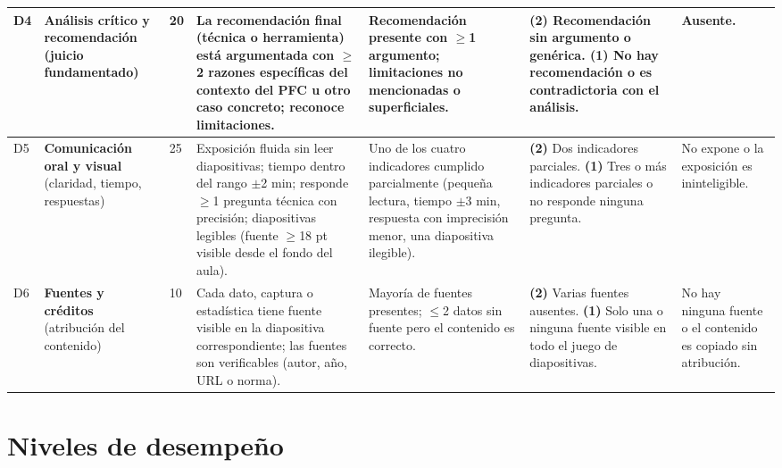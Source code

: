 \documentclass[11pt]{article}
\begin{document}
{\begin{longtable}{|C{0.45cm}|L{2.4cm}|C{0.65cm}|L{3.1cm}|L{3.1cm}|L{3.1cm}|L{2.4cm}|}
	\hline
	 D4 & \textbf{Análisis crítico y recomendación} (juicio fundamentado) & 20 & La recomendación final (técnica o herramienta) está argumentada con $\geq$2 razones específicas del contexto del PFC u otro caso concreto; reconoce limitaciones. & Recomendación presente con $\geq$1 argumento; limitaciones no mencionadas o superficiales. & \textbf{(2)} Recomendación sin argumento o genérica. \textbf{(1)} No hay recomendación o es contradictoria con el análisis. & Ausente.\\
	\hline
	D5 & \textbf{Comunicación oral y visual} (claridad, tiempo, respuestas) & 25 & Exposición fluida sin leer diapositivas; tiempo dentro del rango $\pm$2 min; responde $\geq$1 pregunta técnica con precisión; diapositivas legibles (fuente $\geq$18 pt visible desde el fondo del aula). & Uno de los cuatro indicadores cumplido parcialmente (pequeña lectura, tiempo $\pm$3 min, respuesta con imprecisión menor, una diapositiva ilegible). & \textbf{(2)} Dos indicadores parciales. \textbf{(1)} Tres o más indicadores parciales o no responde ninguna pregunta. & No expone o la exposición es ininteligible.\\
	\hline
	 D6 & \textbf{Fuentes y créditos} (atribución del contenido) & 10 & Cada dato, captura o estadística tiene fuente visible en la diapositiva correspondiente; las fuentes son verificables (autor, año, URL o norma). & Mayoría de fuentes presentes; $\leq$2 datos sin fuente pero el contenido es correcto. & \textbf{(2)} Varias fuentes ausentes. \textbf{(1)} Solo una o ninguna fuente visible en todo el juego de diapositivas. & No hay ninguna fuente o el contenido es copiado sin atribución.\\
	\hline
\end{longtable}
}

\section{\textcolor{utegreendk}{Niveles de desempeño}}\label{sec:niveles}
\end{document}
